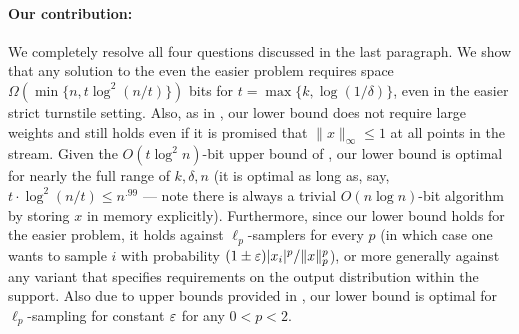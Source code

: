 \paragraph{Our contribution:} We completely resolve all four questions discussed in the last paragraph. We show that any solution to the even the easier  problem requires space $\Omega(\min\{n, t \log^2(n/t)\})$ bits for $t = \max\{k, \log(1/\delta)\}$, even in the easier strict turnstile setting. Also, as in \cite{JowhariST11}, our lower bound does not require large weights and still holds even if it is promised that $\|x\|_\infty \le 1$ at all points in the stream. Given the $O(t\log^2 n)$-bit upper bound of \cite{JowhariST11}, our lower bound is optimal for nearly the full range of $k, \delta, n$ (it is optimal as long as, say, $t\cdot \log^2(n/t)\le n^{.99}$ --- note there is always a trivial $O(n \log n)$-bit algorithm by storing $x$ in memory explicitly). Furthermore, since our lower bound holds for the easier \suppfind{} problem, it holds against $\ell_p$-samplers for every $p$ (in which case one wants to sample $i$ with probability $(1\pm\varepsilon)|x_i|^p/\|x\|_p^p$), or more generally against any variant that specifies requirements on the output distribution within the support. Also due to upper bounds provided in \cite{JowhariST11}, our lower bound is optimal for $\ell_p$-sampling for constant $\varepsilon$ for any $0<p<2$.



